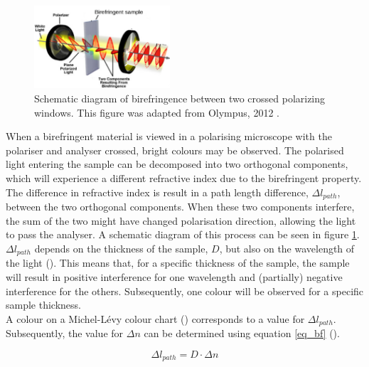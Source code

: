 \begin{figure}
	\centering
	\includegraphics[width=0.45\textwidth]{afbeeldingen/bf_principle.png}
	\caption{Schematic diagram of birefringence between two crossed polarizing windows. This figure was adapted from Olympus, 2012 \cite{olympus}.}
	\label{fig_bf_diagram}
\end{figure}

When a birefringent material is viewed in a polarising microscope with the polariser and analyser crossed, bright colours may be observed. The polarised light entering the sample can be decomposed into two orthogonal components, which will experience a different refractive index due to the birefringent property. The difference in refractive index is result in a path length difference, $\Delta l_{path}$, between the two orthogonal components. When these two components interfere, the sum of the two might have changed polarisation direction, allowing the light to pass the analyser. A schematic diagram of this process can be seen in figure \ref{fig_bf_diagram}. \\
$\Delta l_{path}$ depends on the thickness of the sample, $D$, but also on the wavelength of the light (\cite{hecht}). This means that, for a specific thickness of the sample, the sample will result in positive interference for one wavelength and (partially) negative interference for the others. Subsequently, one colour will be observed for a specific sample thickness.\\
A colour on a Michel-L\'evy colour chart (\cite{bf_chart}) corresponds to a value for $\Delta l_{path}$. Subsequently, the value for $\Delta n$ can be determined using equation \eqref{eq_bf} (\cite{hecht}).

\begin{equation}
	\label{eq_bf}
	\Delta l_{path} = D \cdot \Delta n
\end{equation}


\bigskip
\vspace{5mm}


